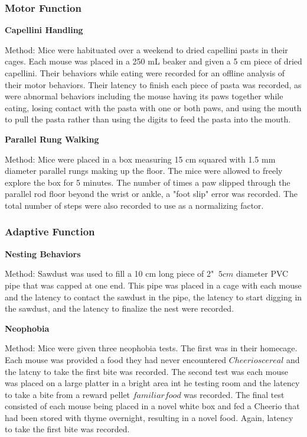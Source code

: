 \documentclass{article}
\begin{document}
\subsubsection{Motor Function}
\textbf{Capellini Handling}

Method:
Mice were habituated over a weekend to dried capellini pasts in their cages. Each mouse was placed in a 250 mL beaker and given a 5 cm piece of dried capellini. Their behaviors while eating were recorded for an offline analysis of their motor behaviors. Their latency to finish each piece of pasta was recorded, as were abnormal behaviors including the mouse having its paws together while eating, losing contact with the pasta with one or both paws, and using the mouth to pull the pasta rather than using the digits to feed the pasta into the mouth.

\textbf{Parallel Rung Walking}

Method:
Mice were placed in a box measuring 15 cm squared with 1.5 mm diameter parallel rungs making up the floor. The mice were allowed to freely explore the box for 5 minutes. The number of times a paw slipped through the parallel rod floor beyond the wrist or ankle, a "foot slip" error was recorded. The total number of steps were also recorded to use as a normalizing factor.

\subsubsection{Adaptive Function}
\textbf{Nesting Behaviors}

Method:
Sawdust was used to fill a 10 cm long piece of 2" \(~5 cm\) diameter PVC pipe that was capped at one end. This pipe was placed in a cage with each mouse and the latency to contact the sawdust in the pipe, the latency to start digging in the sawdust, and the latency to finalize the nest were recorded.

\textbf{Neophobia}

Method:
Mice were given three neophobia tests. The first was in their homecage. Each mouse was provided a food they had never encountered \(Cheerios cereal\) and the latcny to take the first bite was recorded. The second test was each mouse was placed on a large platter in a bright area int he testing room and the latency to take a bite from a reward pellet \(familiar food\) was recorded. The final test consisted of each mouse being placed in a novel white box and fed a Cheerio that had been stored with thyme overnight, resulting in a novel food. Again, latency to take the first bite was recorded.
\end{document}

